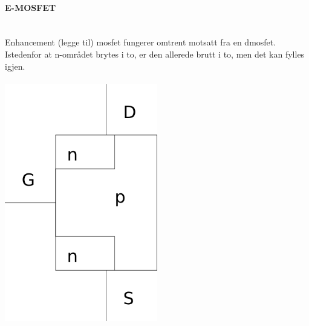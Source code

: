 \paragraph{E-MOSFET} \mbox{} \\
Enhancement (legge til) mosfet fungerer omtrent motsatt fra en dmosfet.
Istedenfor at n-området brytes i to, er den allerede brutt i to, men det kan
fylles igjen.
\\\\
\includegraphics[width=0.5\textwidth]{./img/emosfet}

